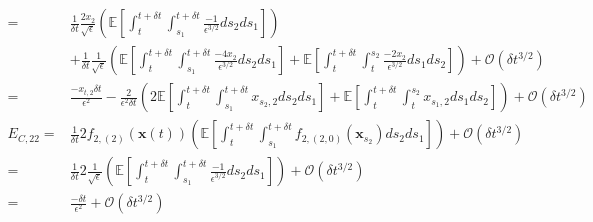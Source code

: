 \begin{equation}
\begin{aligned}
=& 
\frac{1}{\delta t} \frac{2 x_2}{\sqrt{\epsilon}} \left( \mathbb{E} \left[ \int_t^{t+\delta t} \int_{s_1}^{t+\delta t} \frac{-1}{\epsilon^{3/2}} ds_2 ds_1 \right]  \right) \\
&+ \frac{1}{\delta t} \frac{1}{\sqrt{\epsilon}} \left( \mathbb{E} \left[ \int_t^{t+\delta t} \int_{s_1}^{t + \delta t} \frac{-4 x_2}{\epsilon^{3/2}} ds_2 ds_1 \right]
+ \mathbb{E} \left[ \int_t^{t+\delta t} \int_t^{s_2} \frac{-2 x_2}{\epsilon^{3/2}} ds_1 ds_2 \right] \right) 
+ \mathcal{O} (\delta t^{3/2}) \\
=& 
 \frac{- x_{t,2} \delta t}{\epsilon^2}
- \frac{2}{\epsilon^2 \delta t} \left( 2 \mathbb{E} \left[ \int_t^{t+\delta t} \int_{s_1}^{t + \delta t} x_{s_2,2} ds_2 ds_1 \right]
+ \mathbb{E} \left[ \int_t^{t+\delta t} \int_t^{s_2} x_{s_1,2} ds_1 ds_2 \right] \right) 
+ \mathcal{O} (\delta t^{3/2}) \\
E_{C, 22} 
=&
 \frac{1}{\delta t} 2 f_{2,(2)}(\mathbf{x}(t)) \left( \mathbb{E} \left[ \int_t^{t+\delta t} \int_{s_1}^{t+\delta t} f_{2,(2,0)}(\mathbf{x}_{s_2}) ds_2 ds_1 \right]  \right) 
+ \mathcal{O} (\delta t^{3/2}) \\
=&
 \frac{1}{\delta t} 2 \frac{1}{\sqrt{\epsilon}} \left( \mathbb{E} \left[ \int_t^{t+\delta t} \int_{s_1}^{t+\delta t} \frac{-1}{\epsilon^{3/2}} ds_2 ds_1 \right]  \right) 
+ \mathcal{O} (\delta t^{3/2})\\
=&
\frac{-\delta t}{\epsilon^2} 
+ \mathcal{O} (\delta t^{3/2})
\end{aligned}
\end{equation}
